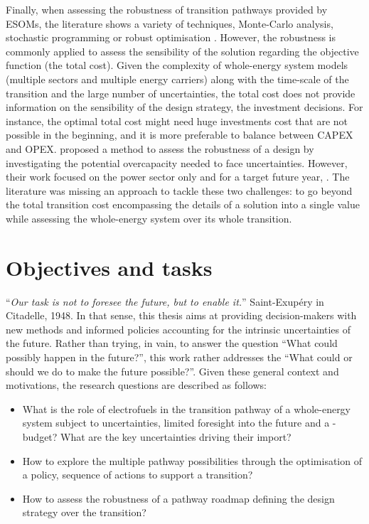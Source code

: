 Finally, when assessing the robustness of transition pathways provided by ESOMs, the literature shows a variety of techniques, \eg Monte-Carlo analysis, stochastic programming or robust optimisation \cite{yue2018review}. However, the robustness is commonly applied to assess the sensibility of the solution regarding the objective function (\ie the total cost).  Given the complexity of whole-energy system models (\ie multiple sectors and multiple energy carriers) along with the time-scale of the transition and the large number of uncertainties, the total cost does not provide information on the sensibility of the design strategy, \ie the investment decisions. For instance, the optimal total cost might need huge investments cost that are not possible in the beginning, and it is more preferable to balance between \gls{CAPEX} and \gls{OPEX}. \citet{moret2020overcapacity} proposed a method to assess the robustness of a design by investigating the potential overcapacity needed to face uncertainties. However, their work focused on the power sector only and for a target future year, .  The literature was missing an approach to tackle these two challenges: to go beyond the total transition cost encompassing the details of a solution into a single value while assessing the whole-energy system over its whole transition.

\section*{Objectives and tasks}
``\textit{Our task is not to foresee the future, but to enable it.}'' Saint-Exupéry in Citadelle, 1948. In that sense, this thesis aims at providing decision-makers with new methods and informed policies accounting for the intrinsic uncertainties of the future.  Rather than trying, in vain, to answer the question ``What could possibly happen in the future?'', this work rather addresses the ``What could or should we do to make the future possible?''. Given these general context and motivations, the research questions are described as follows:
\begin{itemize}
\item What is the role of electrofuels in the transition pathway of a whole-energy system subject to uncertainties, limited foresight into the future and a -budget? What are the key uncertainties driving their import?
\item How to explore the multiple pathway possibilities through the optimisation of a policy, \ie sequence of actions to support a transition?
\item How to assess the robustness of a pathway roadmap defining the design strategy over the transition?
\end{itemize}

